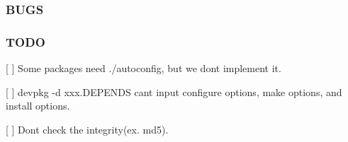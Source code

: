 \subsubsection*{B\+U\+G\+S}

\subsubsection*{T\+O\+D\+O}


\begin{DoxyItemize}
\item \mbox{[} \mbox{]} Some packages need ./autoconfig, but we don\textquotesingle{}t implement it.
\item \mbox{[} \mbox{]} {\ttfamily devpkg -\/d xxx.\+D\+E\+P\+E\+N\+D\+S} can\textquotesingle{}t input configure options, make options, and install options.
\item \mbox{[} \mbox{]} Don\textquotesingle{}t check the integrity(ex. md5). 
\end{DoxyItemize}